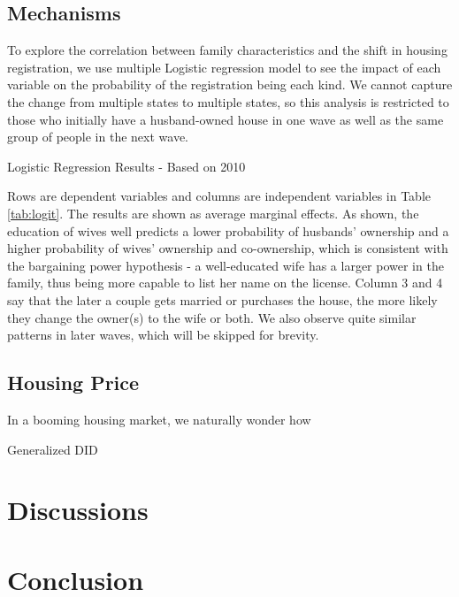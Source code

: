 \documentclass[11pt]{article}
\begin{document}
\subsection{Mechanisms}

To explore the correlation between family characteristics and the shift in housing registration, we use multiple Logistic regression model to see the impact of each variable on the probability of the registration being each kind. We cannot capture the change from multiple states to multiple states, so this analysis is restricted to those who initially have a husband-owned house in one wave as well as the same group of people in the next wave. 

\begin{table}[h]
    \centering
    
    \caption{Logistic Regression Results - Based on 2010}
    \label{tab:logit}

\end{table}

Rows are dependent variables and columns are independent variables in Table \ref{tab:logit}. The results are shown as average marginal effects. As shown, the education of wives well predicts a lower probability of husbands' ownership and a higher probability of wives' ownership and co-ownership, which is consistent with the bargaining power hypothesis - a well-educated wife has a larger power in the family, thus being more capable to list her name on the license. Column 3 and 4 say that the later a couple gets married or purchases the house, the more likely they change the owner(s) to the wife or both. We also observe quite similar patterns in later waves, which will be skipped for brevity.



\subsection{Housing Price}

In a booming housing market, we naturally wonder how 

\begin{table}
    \centering
    \caption{Generalized DID}
    \label{tab:did}
\end{table}

\section{Discussions} \label{sec:discussion}

\section{Conclusion} \label{sec:conclusion}



\singlespacing
\setlength\bibsep{0pt}






\end{document}
